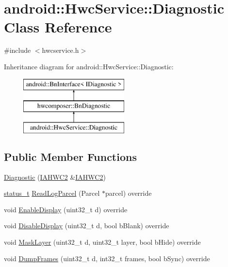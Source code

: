 \hypertarget{classandroid_1_1HwcService_1_1Diagnostic}{}\section{android\+:\+:Hwc\+Service\+:\+:Diagnostic Class Reference}
\label{classandroid_1_1HwcService_1_1Diagnostic}


{\ttfamily \#include $<$hwcservice.\+h$>$}

Inheritance diagram for android\+:\+:Hwc\+Service\+:\+:Diagnostic\+:\begin{figure}[H]
\begin{center}
\leavevmode
\includegraphics[height=3.000000cm]{classandroid_1_1HwcService_1_1Diagnostic}
\end{center}
\end{figure}
\subsection*{Public Member Functions}
\begin{DoxyCompactItemize}
\item 
\mbox{\hyperlink{classandroid_1_1HwcService_1_1Diagnostic_a415e65935b1c00ddcdc68c3fbac876cd}{Diagnostic}} (\mbox{\hyperlink{classandroid_1_1IAHWC2}{I\+A\+H\+W\+C2}} \&\mbox{\hyperlink{classandroid_1_1IAHWC2}{I\+A\+H\+W\+C2}})
\item 
\mbox{\hyperlink{hwcserviceapi_8h_a3806fb2027d9a316d8ca8d9b8b8eb96f}{status\+\_\+t}} \mbox{\hyperlink{classandroid_1_1HwcService_1_1Diagnostic_a201369c6711b3b26f64fbf8262ad2618}{Read\+Log\+Parcel}} (Parcel $\ast$parcel) override
\item 
void \mbox{\hyperlink{classandroid_1_1HwcService_1_1Diagnostic_a405d3f313ca6b1a8848a802a3e56a0a5}{Enable\+Display}} (uint32\+\_\+t d) override
\item 
void \mbox{\hyperlink{classandroid_1_1HwcService_1_1Diagnostic_ac9cd5bafbc4f622450327c63cb3b7746}{Disable\+Display}} (uint32\+\_\+t d, bool b\+Blank) override
\item 
void \mbox{\hyperlink{classandroid_1_1HwcService_1_1Diagnostic_afe11cd5e9e11147eebb0f2c57e693395}{Mask\+Layer}} (uint32\+\_\+t d, uint32\+\_\+t layer, bool b\+Hide) override
\item 
void \mbox{\hyperlink{classandroid_1_1HwcService_1_1Diagnostic_a6a44a6c97a8e4afc4d8940b7df671ef6}{Dump\+Frames}} (uint32\+\_\+t d, int32\+\_\+t frames, bool b\+Sync) override
\end{DoxyCompactItemize}


